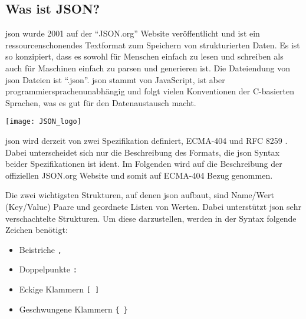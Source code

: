 \subsection{Was ist JSON?}\label{json_kapitel}
\begin{minipage}{0.6\textwidth}
	\acf{json} wurde 2001 auf der \enquote{JSON.org} Website veröffentlicht und ist ein ressourcenschonendes Textformat zum Speichern von strukturierten Daten. Es ist so konzipiert, dass es sowohl für Menschen einfach zu lesen und schreiben als auch für Maschinen einfach zu parsen und generieren ist. Die Dateiendung von \acs{json} Dateien ist \enquote{.json}. \acs{json} stammt von JavaScript, ist aber programmiersprachenunabhängig und folgt vielen Konventionen der C-basierten Sprachen, was es gut für den Datenaustausch macht. \cite[vgl.][]{json_org:o.J., ECMA:2017}
\end{minipage}%
\hfill
\begin{minipage}{0.37\textwidth}
	\centering	
	\texttt{[image: JSON\_logo]}
\end{minipage}
\vspace{1ex}

\acs{json} wird derzeit von zwei Spezifikation definiert, ECMA-404 \cite[vgl.][]{ECMA:2017} und RFC 8259 \cite[vgl.][]{Bray:2017}. Dabei unterscheidet sich nur die Beschreibung des Formats, die \acs{json} Syntax beider Spezifikationen ist ident. Im Folgenden wird auf die Beschreibung der offiziellen JSON.org Website \cite[vgl.][]{json_org:o.J.} und somit auf ECMA-404 \cite[vgl.][]{ECMA:2017} Bezug genommen.

Die zwei wichtigsten Strukturen, auf denen \acs{json} aufbaut, sind Name/Wert (\engl Key/Value) Paare und geordnete Listen von Werten. Dabei unterstützt \acs{json} sehr verschachtelte Strukturen. Um diese darzustellen, werden in der Syntax folgende Zeichen benötigt:
\begin{itemize}
	 \item Beistriche \lstinline|,|
	 \item Doppelpunkte \lstinline|:|
	 \item Eckige Klammern \lstinline|[ ]|
	 \item Geschwungene Klammern \lstinline|{ }|
\end{itemize}


